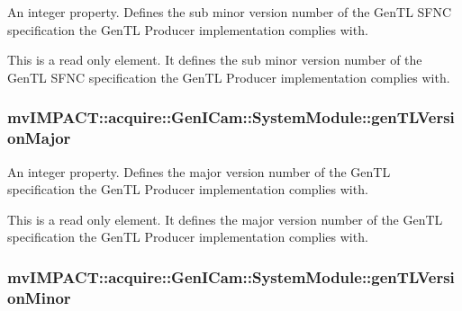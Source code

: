 An integer property. Defines the sub minor version number of the Gen\+T\+L S\+F\+N\+C specification the Gen\+T\+L Producer implementation complies with. 

This is a read only element. It defines the sub minor version number of the Gen\+T\+L S\+F\+N\+C specification the Gen\+T\+L Producer implementation complies with. \hypertarget{classmv_i_m_p_a_c_t_1_1acquire_1_1_gen_i_cam_1_1_system_module_a0d18ebd0935c13034576105263123ea6}{
\subsubsection[{gen\+T\+L\+Version\+Major}]{ mv\+I\+M\+P\+A\+C\+T\+::acquire\+::\+Gen\+I\+Cam\+::\+System\+Module\+::gen\+T\+L\+Version\+Major}}\label{classmv_i_m_p_a_c_t_1_1acquire_1_1_gen_i_cam_1_1_system_module_a0d18ebd0935c13034576105263123ea6}


An integer property. Defines the major version number of the Gen\+T\+L specification the Gen\+T\+L Producer implementation complies with. 

This is a read only element. It defines the major version number of the Gen\+T\+L specification the Gen\+T\+L Producer implementation complies with. \hypertarget{classmv_i_m_p_a_c_t_1_1acquire_1_1_gen_i_cam_1_1_system_module_a7f7476e44901bb10365032ea76b2f57a}{
\subsubsection[{gen\+T\+L\+Version\+Minor}]{ mv\+I\+M\+P\+A\+C\+T\+::acquire\+::\+Gen\+I\+Cam\+::\+System\+Module\+::gen\+T\+L\+Version\+Minor}}\label{classmv_i_m_p_a_c_t_1_1acquire_1_1_gen_i_cam_1_1_system_module_a7f7476e44901bb10365032ea76b2f57a}


